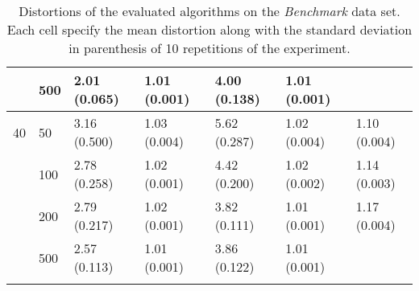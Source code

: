 \begin{longtable}{lllllll}
   & 500 &  2.01 (0.065) &   1.01 (0.001) &  4.00 (0.138) &         1.01 (0.001) &  \\
 \midrule
40 & 50  &  3.16 (0.500) &   1.03 (0.004) &  5.62 (0.287) &         1.02 (0.004) &  1.10 (0.004) \\
   & 100 &  2.78 (0.258) &   1.02 (0.001) &  4.42 (0.200) &         1.02 (0.002) &  1.14 (0.003) \\
   & 200 &  2.79 (0.217) &   1.02 (0.001) &  3.82 (0.111) &         1.01 (0.001) &  1.17 (0.004) \\
   & 500 &  2.57 (0.113) &   1.01 (0.001) &  3.86 (0.122) &         1.01 (0.001) &            \\
\bottomrule
\caption{Distortions of the evaluated algorithms on the \textit{Benchmark} data set. Each cell specify the mean distortion along with the standard deviation in parenthesis of 10 repetitions of the experiment.}
\label{tab:distortions-mean-std-benchmark}
\end{longtable}

